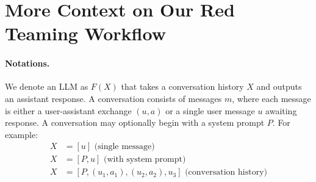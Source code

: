 \section{More Context on Our Red Teaming Workflow}\label{appendix:workflow}




\paragraph{Notations.} 
We denote an LLM as $F(X)$ that takes a conversation history $X$ and outputs an assistant response. A conversation consists of messages $m$, where each message is either a user-assistant exchange $(u,a)$ or a single user message $u$ awaiting response. A conversation may optionally begin with a system prompt $P$. For example:
\begin{align*}
    X &= [u] \text{ (single message)} \\
    X &= [P, u] \text{ (with system prompt)} \\
    X &= [P, (u_1, a_1), (u_2, a_2), u_3] \text{ (conversation history)}
\end{align*}

